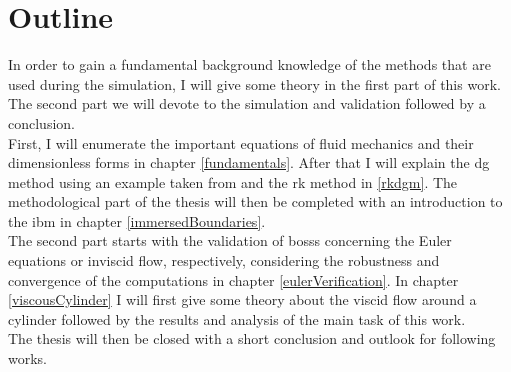 \section{Outline}
In order to gain a fundamental background knowledge of the methods that are used during the simulation, I will give some theory in the first part of this work. The second part we will devote to the simulation and validation followed by a conclusion. \\ \indent
First, I will enumerate the important equations of fluid mechanics and their dimensionless forms in chapter \ref{fundamentals}. After that I will explain the \gls{dg} method using an example taken from \cite{mueller2014} and the \gls{rk} method in \ref{rkdgm}. The methodological part of the thesis will then be completed with an introduction to the \gls{ibm} in chapter \ref{immersedBoundaries}. \\ \indent
The second part starts with the validation of \gls{bosss} concerning the Euler equations or inviscid flow, respectively, considering the robustness and convergence of the computations in chapter \ref{eulerVerification}. In chapter \ref{viscousCylinder} I will first give some theory about the viscid flow around a cylinder followed by the results and analysis of the main task of this work. \\ \indent
The thesis will then be closed with a short conclusion and outlook for following works.







































